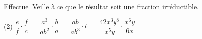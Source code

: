 %
%
Effectue. Veille à ce que le résultat soit une fraction irréductible.
  \begin{tasks}(2)
    \task $\dfrac{e}{f} \cdot \dfrac{f}{c}=$
    \task $\dfrac{a^3}{ab^2} \cdot \dfrac{b}{a}=$
    \task $\dfrac{ab}{ab^3} \cdot b=$
    \task $\dfrac{42x^3y^8}{x^5y} \cdot \dfrac{x^6y}{6x}=$
  \end{tasks}
